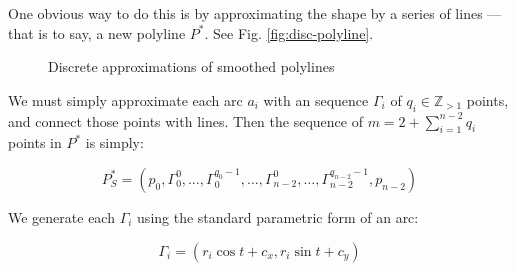 \documentclass{article}
\begin{document}
One obvious way to do this is by approximating the shape by a series of lines --- that is to say, a new polyline $P^*$.  See Fig. \ref{fig:disc-polyline}.

\begin{figure}
  \centering
  \hfill
  \caption{Discrete approximations of smoothed polylines}
\end{figure}

We must simply approximate each arc $a_i$ with an sequence $\Gamma_i$ of $q_i \in \mathbb{Z}_{>1}$ points, and connect those points with lines.  Then the sequence of $m = 2 + \sum^{n-2}_{i=1} q_i$ points in $P^*$ is simply:

\begin{equation}
  \label{eq:p-star}
  P^*_S = \left(p_0, \Gamma^0_0, \ldots, \Gamma^{q_0-1}_0, \ldots, \Gamma^{0}_{n-2}, \ldots, \Gamma^{q_{n-2}-1}_{n-2},  p_{n-2}\right)
\end{equation}

We generate each $\Gamma_i$ using the standard parametric form of an arc:

\begin{equation}
  \label{eq:arc-segments}
  \Gamma_i = \left(r_i \cos t + c_x, r_i \sin t + c_y\right)
\end{equation}
\end{document}
